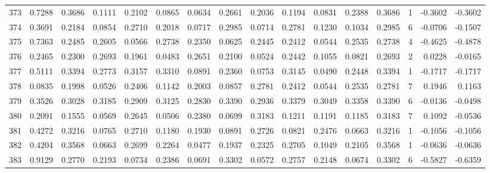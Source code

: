 \begin{tabular}{lrrrrrrrrrrrrrrr}
373 &      0.7288 &  0.3686 &  0.1111 &  0.2102 &  0.0865 &  0.0634 &  0.2661 &  0.2036 &  0.1194 &  0.0831 &   0.2388 &     0.3686 &      1 &                   -0.3602 &                    -0.3602 \\
374 &      0.3691 &  0.2184 &  0.0854 &  0.2710 &  0.2018 &  0.0717 &  0.2985 &  0.0714 &  0.2781 &  0.1230 &   0.1034 &     0.2985 &      6 &                   -0.0706 &                    -0.1507 \\
375 &      0.7363 &  0.2485 &  0.2605 &  0.0566 &  0.2738 &  0.2350 &  0.0625 &  0.2445 &  0.2412 &  0.0544 &   0.2535 &     0.2738 &      4 &                   -0.4625 &                    -0.4878 \\
376 &      0.2465 &  0.2300 &  0.2693 &  0.1961 &  0.0483 &  0.2651 &  0.2100 &  0.0524 &  0.2442 &  0.1055 &   0.0821 &     0.2693 &      2 &                    0.0228 &                    -0.0165 \\
377 &      0.5111 &  0.3394 &  0.2773 &  0.3157 &  0.3310 &  0.0891 &  0.2360 &  0.0753 &  0.3145 &  0.0490 &   0.2448 &     0.3394 &      1 &                   -0.1717 &                    -0.1717 \\
378 &      0.0835 &  0.1998 &  0.0526 &  0.2406 &  0.1142 &  0.2003 &  0.0857 &  0.2781 &  0.2412 &  0.0544 &   0.2535 &     0.2781 &      7 &                    0.1946 &                     0.1163 \\
379 &      0.3526 &  0.3028 &  0.3185 &  0.2909 &  0.3125 &  0.2830 &  0.3390 &  0.2936 &  0.3379 &  0.3049 &   0.3358 &     0.3390 &      6 &                   -0.0136 &                    -0.0498 \\
380 &      0.2091 &  0.1555 &  0.0569 &  0.2645 &  0.0506 &  0.2380 &  0.0699 &  0.3183 &  0.1211 &  0.1191 &   0.1185 &     0.3183 &      7 &                    0.1092 &                    -0.0536 \\
381 &      0.4272 &  0.3216 &  0.0765 &  0.2710 &  0.1180 &  0.1930 &  0.0891 &  0.2726 &  0.0821 &  0.2476 &   0.0663 &     0.3216 &      1 &                   -0.1056 &                    -0.1056 \\
382 &      0.4204 &  0.3568 &  0.0663 &  0.2699 &  0.2264 &  0.0477 &  0.1937 &  0.2325 &  0.2705 &  0.1049 &   0.2105 &     0.3568 &      1 &                   -0.0636 &                    -0.0636 \\
383 &      0.9129 &  0.2770 &  0.2193 &  0.0734 &  0.2386 &  0.0691 &  0.3302 &  0.0572 &  0.2757 &  0.2148 &   0.0674 &     0.3302 &      6 &                   -0.5827 &                    -0.6359 \\

\end{tabular}
